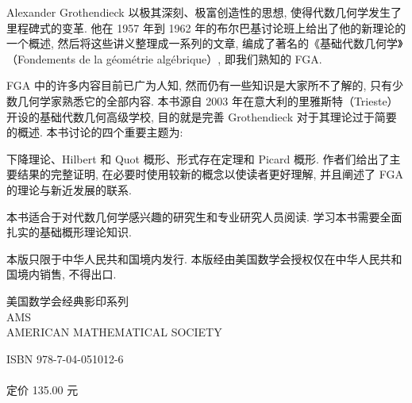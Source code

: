 \begin{titlepage}
\vspace*{-7mm}
\noindent\begin{minipage}[t]{104mm}\small\sffamily
\setlength{\parindent}{1.5em}
Alexander Grothendieck 以极其深刻、极富创造性的思想, 使得代数几何学发生了里程碑式的变革. 他在 1957 年到 1962 年的布尔巴基讨论班上给出了他的新理论的一个概述, 然后将这些讲义整理成一系列的文章, 编成了著名的《基础代数几何学》（Fondements de la géométrie algébrique）, 即我们熟知的 FGA.

FGA 中的许多内容目前已广为人知, 然而仍有一些知识是大家所不了解的, 只有少数几何学家熟悉它的全部内容. 本书源自 2003 年在意大利的里雅斯特（Trieste）开设的基础代数几何高级学校, 目的就是完善 Grothendieck 对于其理论过于简要的概述. 本书讨论的四个重要主题为:

下降理论、Hilbert 和 Quot 概形、形式存在定理和 Picard 概形. 作者们给出了主要结果的完整证明, 在必要时使用较新的概念以使读者更好理解, 并且阐述了 FGA 的理论与新近发展的联系.

本书适合于对代数几何学感兴趣的研究生和专业研究人员阅读. 学习本书需要全面扎实的基础概形理论知识.
\end{minipage}\hfill
\begin{minipage}[t]{29mm}\fontsize{7}{10}\selectfont\sffamily
本版只限于中华人民共和国境内发行. 本版经由美国数学会授权仅在中华人民共和国境内销售, 不得出口.
\end{minipage}
\par\vspace{12mm}\noindent\sffamily 美国数学会经典影印系列\\{\Huge AMS}\\{\fontsize{5}{7}\selectfont AMERICAN MATHEMATICAL SOCIETY}
\vfill
\begin{flushright}\ttfamily ISBN 978-7-04-051012-6\\
\\\normalfont 定价 135.00 元\end{flushright}
\end{titlepage}

